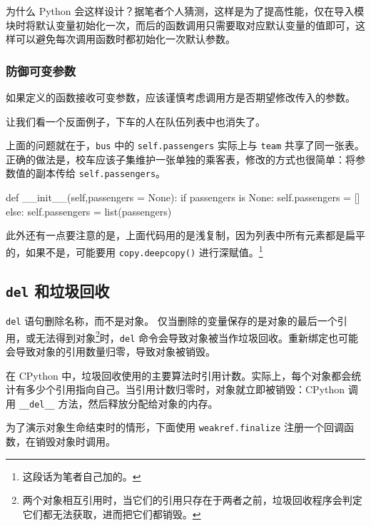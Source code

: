 为什么 Python 会这样设计？据笔者个人猜测，这样是为了提高性能，仅在导入模块时将默认变量初始化一次，而后的函数调用只需要取对应默认变量的值即可，这样可以避免每次调用函数时都初始化一次默认参数。

\subsubsection{防御可变参数}

如果定义的函数接收可变参数，应该谨慎考虑调用方是否期望修改传入的参数。

让我们看一个反面例子，下车的人在队伍列表中也消失了。



上面的问题就在于，\texttt{bus} 中的 \texttt{self.passengers} 实际上与 \texttt{team} 共享了同一张表。正确的做法是，校车应该子集维护一张单独的乘客表，修改的方式也很简单：将参数值的副本传给 \texttt{self.passengers}。

\begin{python}
def __init__(self,passengers = None):
    if passengers is None:
        self.passengers = []
    else:
        self.passengers = list(passengers)
\end{python}

此外还有一点要注意的是，上面代码用的是浅复制，因为列表中所有元素都是扁平的，如果不是，可能要用 \texttt{copy.deepcopy()} 进行深赋值。\footnote{这段话为笔者自己加的。}

\subsection{\texttt{del} 和垃圾回收}

\texttt{del} 语句删除名称，而不是对象。 仅当删除的变量保存的是对象的最后一个引用，或无法得到对象\footnote{两个对象相互引用时，当它们的引用只存在于两者之前，垃圾回收程序会判定它们都无法获取，进而把它们都销毁。}时，\texttt{del} 命令会导致对象被当作垃圾回收。重新绑定也可能会导致对象的引用数量归零，导致对象被销毁。

在 CPython 中，垃圾回收使用的主要算法时引用计数。实际上，每个对象都会统计有多少个引用指向自己。当引用计数归零时，对象就立即被销毁：CPython 调用 \texttt{\_\_del\_\_} 方法，然后释放分配给对象的内存。

为了演示对象生命结束时的情形，下面使用 \texttt{weakref.finalize} 注册一个回调函数，在销毁对象时调用。



